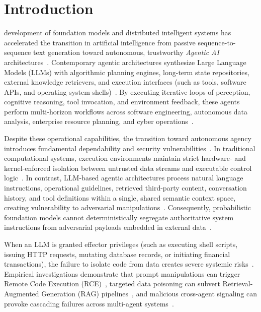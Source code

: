 \section{Introduction}
\label{sec:introduction}

 development of foundation models and distributed intelligent systems has accelerated the transition in artificial intelligence from passive sequence-to-sequence text generation toward autonomous, trustworthy \textit{Agentic AI} architectures~\cite{min2023recent, wei2024trustworthy, chander2024toward, goyal2023survey, standen2024adversarial, dehghantanha2026sok, deng2025ai}. Contemporary agentic architectures synthesize Large Language Models (LLMs) with algorithmic planning engines, long-term state repositories, external knowledge retrievers, and execution interfaces (such as tools, software APIs, and operating system shells)~\cite{narajala2025securing}. By executing iterative loops of perception, cognitive reasoning, tool invocation, and environment feedback, these agents perform multi-horizon workflows across software engineering, autonomous data analysis, enterprise resource planning, and cyber operations~\cite{liu2024demystifying, helpnet2023genai}.

Despite these operational capabilities, the transition toward autonomous agency introduces fundamental dependability and security vulnerabilities~\cite{iyer2007editorial, schneier2023trustworthy}. In traditional computational systems, execution environments maintain strict hardware- and kernel-enforced isolation between untrusted data streams and executable control logic~\cite{dehghantanha2026sok}. In contrast, LLM-based agentic architectures process natural language instructions, operational guidelines, retrieved third-party content, conversation history, and tool definitions within a single, shared semantic context space, creating vulnerability to adversarial manipulations~\cite{greshake2023not, sutton2024indirect}. Consequently, probabilistic foundation models cannot deterministically segregate authoritative system instructions from adversarial payloads embedded in external data~\cite{chen2025struq, yi2025benchmarking, vassilev2026robust}.

When an LLM is granted effector privileges (such as executing shell scripts, issuing HTTP requests, mutating database records, or initiating financial transactions), the failure to isolate code from data creates severe systemic risks~\cite{dehghantanha2026sok, liu2024demystifying}. Empirical investigations demonstrate that prompt manipulations can trigger Remote Code Execution (RCE)~\cite{liu2024demystifying}, targeted data poisoning can subvert Retrieval-Augmented Generation (RAG) pipelines~\cite{zou2025poisonedrag, an2025rag, shafran2025machine}, and malicious cross-agent signaling can provoke cascading failures across multi-agent systems~\cite{standen2024adversarial, gu2024agent, peigne2025multi, chen2024blockagents}.

